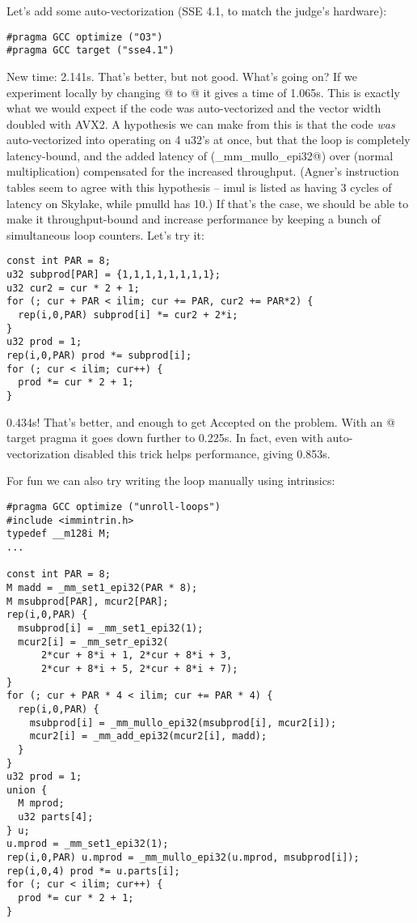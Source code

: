 Let's add some auto-vectorization (SSE 4.1, to match the judge's hardware):
\begin{lstlisting}
#pragma GCC optimize ("O3")
#pragma GCC target ("sse4.1")
\end{lstlisting}

New time: 2.141s. That's better, but not good. What's going on?
If we experiment locally by changing @ to @ it gives a time of 1.065s.
This is exactly what we would expect if the code was auto-vectorized and the vector width doubled with AVX2.
A hypothesis we can make from this is that the code \emph{was} auto-vectorized into operating on 4 u32's at once, but that the loop is completely latency-bound, and the added latency of \verb@pmulld@ (\verb@_mm_mullo_epi32@) over \verb@imul@ (normal multiplication) compensated for the increased throughput.
(Agner's instruction tables seem to agree with this hypothesis -- imul is listed as having 3 cycles of latency on Skylake, while pmulld has 10.)
If that's the case, we should be able to make it throughput-bound and increase performance by keeping a bunch of simultaneous loop counters.
Let's try it:

\begin{lstlisting}
const int PAR = 8;
u32 subprod[PAR] = {1,1,1,1,1,1,1,1};
u32 cur2 = cur * 2 + 1;
for (; cur + PAR < ilim; cur += PAR, cur2 += PAR*2) {
  rep(i,0,PAR) subprod[i] *= cur2 + 2*i;
}
u32 prod = 1;
rep(i,0,PAR) prod *= subprod[i];
for (; cur < ilim; cur++) {
  prod *= cur * 2 + 1;
}
\end{lstlisting}

0.434s! That's better, and enough to get Accepted on the problem.
With an @ target pragma it goes down further to 0.225s.
In fact, even with auto-vectorization disabled this trick helps performance, giving 0.853s.

For fun we can also try writing the loop manually using intrinsics:
\begin{lstlisting}
#pragma GCC optimize ("unroll-loops")
#include <immintrin.h>
typedef __m128i M;
...

const int PAR = 8;
M madd = _mm_set1_epi32(PAR * 8);
M msubprod[PAR], mcur2[PAR];
rep(i,0,PAR) {
  msubprod[i] = _mm_set1_epi32(1);
  mcur2[i] = _mm_setr_epi32(
      2*cur + 8*i + 1, 2*cur + 8*i + 3,
      2*cur + 8*i + 5, 2*cur + 8*i + 7);
}
for (; cur + PAR * 4 < ilim; cur += PAR * 4) {
  rep(i,0,PAR) {
    msubprod[i] = _mm_mullo_epi32(msubprod[i], mcur2[i]);
    mcur2[i] = _mm_add_epi32(mcur2[i], madd);
  }
}
u32 prod = 1;
union {
  M mprod;
  u32 parts[4];
} u;
u.mprod = _mm_set1_epi32(1);
rep(i,0,PAR) u.mprod = _mm_mullo_epi32(u.mprod, msubprod[i]);
rep(i,0,4) prod *= u.parts[i];
for (; cur < ilim; cur++) {
  prod *= cur * 2 + 1;
}
\end{lstlisting}

